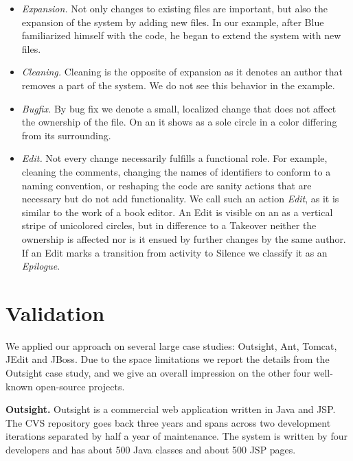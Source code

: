 \documentclass[10pt]{book}
\begin{document}
\begin{itemize}
\item \emph{Expansion.} Not only changes to existing files are important, but also the expansion of the system by adding new files. In our example, after Blue familiarized himself with the code, he began to extend the system with new files.

\item \emph{Cleaning.} Cleaning is the opposite of expansion as it denotes an author that removes a part of the system. We do not see this behavior in the example.

\item \emph{Bugfix.} By bug fix we denote a small, localized change that does not affect the ownership of the file. On an \omap it shows as a sole circle in a color differing from its surrounding.

\item \emph{Edit.} Not every change necessarily fulfills a functional role. For example, cleaning the comments, changing the names of identifiers to conform to a naming convention, or reshaping the code are sanity actions that are necessary but do not add functionality. We call such an action \emph{Edit}, as it is similar to the work of a book editor. An Edit is visible on an \omap as a vertical stripe of unicolored circles, but in difference to a Takeover neither the ownership is affected nor is it ensued by further changes by the same author. If an Edit marks a transition from activity to Silence we classify it as an \emph{Epilogue}.

\end{itemize}

\section{Validation}\label{sec:validation}

We applied our approach on several large case studies: Outsight, Ant, Tomcat, JEdit and JBoss. Due to the space limitations we report the details from the Outsight case study, and we give an overall impression on the other four well-known open-source projects.

\textbf{Outsight.} Outsight is a commercial web application written in Java and JSP. The CVS repository goes back three years and spans across two development iterations separated by half a year of maintenance. The system is written by four developers and has about 500 Java classes and about 500 JSP pages.
\end{document}
